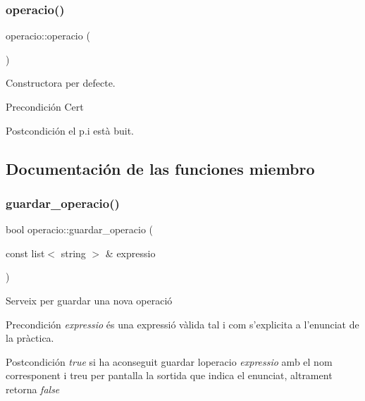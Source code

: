 \subsubsection{\texorpdfstring{operacio()}{operacio()}}
{\footnotesize\ttfamily operacio\+::operacio (\begin{DoxyParamCaption}{ }\end{DoxyParamCaption})}



Constructora per defecte. 

\begin{DoxyPrecond}{Precondición}
Cert 
\end{DoxyPrecond}
\begin{DoxyPostcond}{Postcondición}
el p.\+i està buit. 
\end{DoxyPostcond}


\subsection{Documentación de las funciones miembro}
\hypertarget{classoperacio_aa1f42a80cc416ff33caea9898fe3c9b9}{}\label{classoperacio_aa1f42a80cc416ff33caea9898fe3c9b9} 
\subsubsection{\texorpdfstring{guardar\+\_\+operacio()}{guardar\_operacio()}}
{\footnotesize\ttfamily bool operacio\+::guardar\+\_\+operacio (\begin{DoxyParamCaption}\item[{const list$<$ string $>$ \&}]{expressio }\end{DoxyParamCaption})}



Serveix per guardar una nova operació 

\begin{DoxyPrecond}{Precondición}
{\itshape expressio} és una expressió vàlida tal i com s’explicita a l’enunciat de la pràctica. 
\end{DoxyPrecond}
\begin{DoxyPostcond}{Postcondición}
{\itshape true} si ha aconseguit guardar l\textquotesingle{}operacio {\itshape expressio} amb el nom corresponent i treu per pantalla la sortida que indica el enunciat, altrament retorna {\itshape false} 
\end{DoxyPostcond}
\hypertarget{classoperacio_ab64cf3a9e19efd65c2ea3fe276cfabaf}{}\label{classoperacio_ab64cf3a9e19efd65c2ea3fe276cfabaf} 
